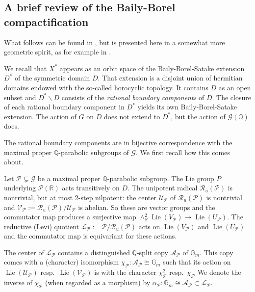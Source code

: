 \documentclass[12pt,letterpaper]{amsart}
\numberwithin{equation}{section}
\def\GG{{\mathbb G}}
\def\QQ{{\mathbb Q}}
\def\RR{{\mathbb R}}
\def\ssm{\smallsetminus}
\def\Acal{{\mathcal A}}
\def\Gcal{{\mathcal G}}
\def\Lcal{{\mathcal L}}
\def\Pcal{{\mathcal P}}
\def\Rcal{{\mathcal R}}
\def\Ucal{{\mathcal U}}
\def\Vcal{{\mathcal V}}
\newcommand\lie{\operatorname{Lie}}
\theoremstyle{remark}
\begin{document}
\subsection{A brief review of the Baily-Borel compactification}
What follows can be found in \cite{amrt}, but is presented here in a somewhat  more geometric  spirit, as for example  in \cite{chen_looij}.

We recall that $X^*$ appears as an orbit space of the Baily-Borel-Satake extension $D^*$ of the symmetric domain $D$.
That extension is a disjoint union of hermitian domains endowed with the so-called horocyclic topology. It contains $D$ as an open subset and $D^*\ssm D$ consists of the \emph{rational boundary components} of $D$. The closure of each rational boundary component in  $D^*$ yields its own Baily-Borel-Satake extension. The action of $G$ on $D$ does not extend to $D^*$, but the action of $\Gcal(\QQ)$  does.

The rational boundary components are in bijective correspondence with the maximal proper $\QQ$-parabolic subgroups of 
$\Gcal$. We first recall  how this comes about. 
 
Let  $\Pcal\subsetneq \Gcal$ be a maximal proper $\QQ$-parabolic subgroup. The Lie group $P$ underlying $\Pcal(\RR)$ acts transitively on $D$.  The unipotent radical $\Rcal_u(\Pcal)$ is nontrivial, but at most 2-step nilpotent:
the  center $\Ucal_\Pcal$ of $\Rcal_u(\Pcal)$ is nontrivial and $\Vcal_\Pcal:=\Rcal_u(\Pcal)/\Ucal_\Pcal$ is abelian. So these are vector groups and the commutator map produces a surjective map $\wedge_\RR^2\lie (V_\Pcal)\to \lie (U_\Pcal)$.
The reductive (Levi) quotient $\Lcal_\Pcal:=\Pcal/\Rcal_u(\Pcal)$ acts on $\lie (V_\Pcal)$ and $\lie (U_\Pcal)$ and the commutator map is equivariant for these actions.   

The center of $\Lcal_\Pcal$ contains a distinguished  $\QQ$-split copy 
$\Acal_\Pcal$ of $\GG_m$. This copy comes  with a (character) isomorphism $\chi_\Pcal: \Acal_\Pcal\cong \GG_m$  such that its  action on 
$\lie(\Ucal_\Pcal)$ resp.\  $\lie(\Vcal_\Pcal)$ is with  the character $\chi_\Pcal^2$ resp.\ $\chi_\Pcal$
We denote the  inverse of  $\chi_\Pcal$ (when regarded as a morphism) by $\alpha_\Pcal:\GG_m\cong  \Acal_\Pcal\subset \Lcal_\Pcal$.
\end{document}

